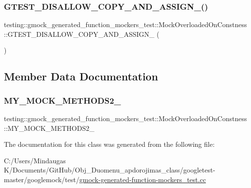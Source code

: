 \subsubsection{\texorpdfstring{GTEST\_DISALLOW\_COPY\_AND\_ASSIGN\_()}{GTEST\_DISALLOW\_COPY\_AND\_ASSIGN\_()}\hspace{0.1cm}{\footnotesize\ttfamily [3/3]}}
{\footnotesize\ttfamily testing\+::gmock\+\_\+generated\+\_\+function\+\_\+mockers\+\_\+test\+::\+Mock\+Overloaded\+On\+Constness\+::\+G\+T\+E\+S\+T\+\_\+\+D\+I\+S\+A\+L\+L\+O\+W\+\_\+\+C\+O\+P\+Y\+\_\+\+A\+N\+D\+\_\+\+A\+S\+S\+I\+G\+N\+\_\+ (\begin{DoxyParamCaption}\item[{\mbox{\hyperlink{classtesting_1_1gmock__generated__function__mockers__test_1_1_mock_overloaded_on_constness}{Mock\+Overloaded\+On\+Constness}}}]{ }\end{DoxyParamCaption})\hspace{0.3cm}{\ttfamily [private]}}



\subsection{Member Data Documentation}
\mbox{\label{classtesting_1_1gmock__generated__function__mockers__test_1_1_mock_overloaded_on_constness_a3447041442c4ca64d597186e894b307d}} 
\subsubsection{\texorpdfstring{MY\_MOCK\_METHODS2\_}{MY\_MOCK\_METHODS2\_}}
{\footnotesize\ttfamily testing\+::gmock\+\_\+generated\+\_\+function\+\_\+mockers\+\_\+test\+::\+Mock\+Overloaded\+On\+Constness\+::\+M\+Y\+\_\+\+M\+O\+C\+K\+\_\+\+M\+E\+T\+H\+O\+D\+S2\+\_\+}



The documentation for this class was generated from the following file\+:\begin{DoxyCompactItemize}
\item 
C\+:/\+Users/\+Mindaugas K/\+Documents/\+Git\+Hub/\+Obj\+\_\+\+Duomenu\+\_\+apdorojimas\+\_\+class/googletest-\/master/googlemock/test/\mbox{\hyperlink{googletest-master_2googlemock_2test_2gmock-generated-function-mockers__test_8cc}{gmock-\/generated-\/function-\/mockers\+\_\+test.\+cc}}\end{DoxyCompactItemize}
